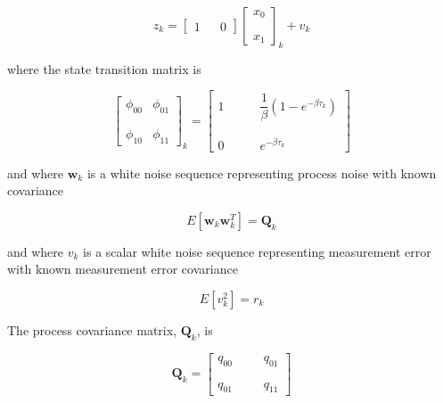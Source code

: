 \documentclass[12pt]{article}
\begin{document}
\begin{equation*}
    z_k = 
    \begin{bmatrix}
    1 & & 0
    \end{bmatrix}
    \begin{bmatrix}
    x_0 \\
    \phantom{m} \\
    x_1
    \end{bmatrix}_k
    +
    v_k
\end{equation*}

where the state transition matrix is

\begin{equation*}
    \begin{bmatrix}
    \phi_{00} & \phi_{01} \\
    \phantom{m} \\
    \phi_{10} & \phi_{11}
    \end{bmatrix}_k
    = 
    \begin{bmatrix}
    1  & \phantom{m} &  \dfrac{1}{\beta} \left ( 1 - e^{- \beta \tau_k} \right ) \\
    \phantom{m} \\
    0  & \phantom{m} &  e^{- \beta \tau_k}
    \end{bmatrix}
\end{equation*}

and where $\mathbf{w}_k$ is a white noise sequence representing process noise with known
covariance

\begin{equation*}
    E[\mathbf{w}_k \mathbf{w}_k^T] = \mathbf{Q}_k
\end{equation*}

and where $v_k$ is a scalar white noise sequence representing measurement error with
known measurement error covariance

\begin{equation*}
    E[v_k^2] = r_k
\end{equation*}

The process covariance matrix, $\mathbf{Q}_k$, is

\begin{equation*}
    \mathbf{Q}_k = 
    \begin{bmatrix}
    q_{00}  & \phantom{m} &  q_{01} \\
    \phantom{m} \\
    q_{01}  & \phantom{m} &  q_{11}
    \end{bmatrix}
\end{equation*}
\end{document}
